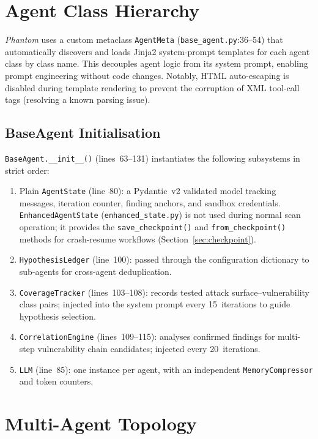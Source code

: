 \documentclass[12pt, a4paper, oneside, openany]{book}
\newcommand{\Phant}{\textit{Phantom}}
\newcommand{\code}[1]{\texttt{#1}}
\newcommand{\file}[1]{\texttt{#1}}
\begin{document}
\section{Agent Class Hierarchy}
\label{sec:hierarchy}

\Phant{} uses a custom metaclass \code{AgentMeta} (\file{base\_agent.py}:36--54) that automatically discovers and loads Jinja2 system-prompt templates for each agent class by class name.  This decouples agent logic from its system prompt, enabling prompt engineering without code changes. Notably, HTML auto-escaping is disabled during template rendering to prevent the corruption of XML tool-call tags (resolving a known parsing issue).

\subsection{BaseAgent Initialisation}

\code{BaseAgent.\_\_init\_\_()} (lines~63--131) instantiates the
following subsystems in strict order:

\begin{enumerate}[leftmargin=*]
  \item Plain \code{AgentState} (line~80): a Pydantic~v2 validated
    model tracking messages, iteration counter, finding anchors, and
    sandbox credentials.  \code{EnhancedAgentState}
    (\file{enhanced\_state.py}) is not used during normal scan operation;
    it provides the \code{save\_checkpoint()} and
    \code{from\_checkpoint()} methods for crash-resume workflows
    (Section~\ref{sec:checkpoint}).
  \item \code{HypothesisLedger} (line~100): passed through the
    configuration dictionary to sub-agents for cross-agent
    deduplication.
  \item \code{CoverageTracker} (lines~103--108): records tested
    attack surface--vulnerability class pairs; injected into the
    system prompt every 15~iterations to guide hypothesis selection.
  \item \code{CorrelationEngine} (lines~109--115): analyses confirmed
    findings for multi-step vulnerability chain candidates; injected
    every 20~iterations.
  \item \code{LLM} (line~85): one instance per agent, with an
    independent \code{MemoryCompressor} and token counters.
\end{enumerate}

\section{Multi-Agent Topology}
\label{sec:multiagent_arch}
\end{document}
